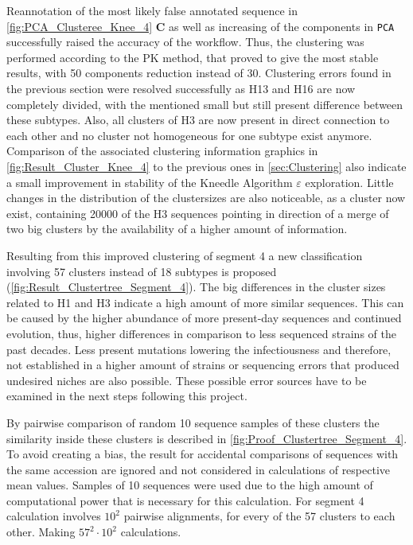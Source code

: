 Reannotation of the most likely false annotated sequence in \autoref{fig:PCA_Clusteree_Knee_4} \textbf{\textsf{C}} as well as increasing of the components in \texttt{PCA} successfully raised the accuracy of the workflow. Thus, the clustering was performed according to the PK method, that proved to give the most stable results, with 50 components reduction instead of 30. Clustering errors found in the previous section were resolved successfully as H13 and H16 are now completely divided, with the mentioned small but still present difference between these subtypes. Also, all clusters of H3 are now present in direct connection to each other and no cluster not homogeneous for one subtype exist anymore. Comparison of the associated clustering information graphics in \autoref{fig:Result_Cluster_Knee_4} to the previous ones in \autoref{sec:Clustering} also indicate a small improvement in stability of the Kneedle Algorithm $\varepsilon$ exploration. Little changes in the distribution of the clustersizes are also noticeable, as a cluster now exist, containing 20000 of the H3 sequences pointing in direction of a merge of two big clusters by the availability of a higher amount of information.  

\newpage

Resulting from this improved clustering of segment 4 a new classification involving 57 clusters instead of 18 subtypes is proposed (\autoref{fig:Result_Clustertree_Segment_4}). The big differences in the cluster sizes related to H1 and H3 indicate a high amount of more similar sequences. This can be caused by the higher abundance of more present-day sequences and continued evolution, thus, higher differences in comparison to less sequenced strains of the past decades. Less present mutations lowering the infectiousness and therefore, not established in a higher amount of strains or sequencing errors that produced undesired niches are also possible. These possible error sources have to be examined in the next steps following this project.

\vspace{1em}

By pairwise comparison of random 10 sequence samples of these clusters the similarity inside these clusters is described in \autoref{fig:Proof_Clustertree_Segment_4}. To avoid creating a bias, the result for accidental comparisons of sequences with the same accession are ignored and not considered in calculations of respective mean values. Samples of 10 sequences were used due to the high amount of computational power that is necessary for this calculation. For segment 4 calculation involves $10^2$ pairwise alignments, for every of the 57 clusters to each other. Making $57^2\cdot 10^2$ calculations.

